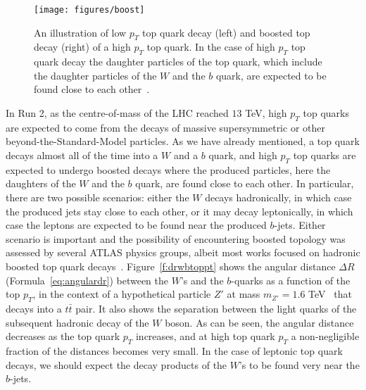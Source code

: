 \vspace{3mm}

\begin{figure}[H]
	\texttt{[image: figures/boost]}
	\centering

	\caption{An illustration of low $p_T$ top quark decay (left) and boosted top
		decay (right) of a high $p_T$ top quark. In the case of high $p_T$ top quark
		decay the daughter particles of the top quark, which include the daughter
		particles of the $W$ and the $b$ quark, are expected to be found close to each
		other~\cite{boostedtop-fig}.}

	\label{f:boosttop}
\end{figure}

\vspace{3mm}

In Run 2, as the centre-of-mass of the LHC reached $13$ TeV, high $p_T$ top
quarks are expected to come from the decays of massive supersymmetric or other
beyond-the-Standard-Model particles. As we have already mentioned, a top quark
decays almost all of the time into a $W$ and a $b$ quark, and high $p_T$ top
quarks are expected to undergo boosted decays where the produced particles,
here the daughters of the $W$ and the $b$ quark, are found close to each other.
In particular, there are two possible scenarios: either the $W$ decays
hadronically, in which case the produced jets stay close to each other, or it
may decay leptonically, in which case the leptons are expected to be found near
the produced $b$-jets. Either scenario is important and the possibility of
encountering boosted topology was assessed by several ATLAS physics groups,
albeit most works focused on hadronic boosted top quark
decays~\cite{hadronic01-ch7, hadronic02-ch7, bdis-figs}.
Figure~\ref{f:drwbtoppt} shows the angular distance $\Delta R$
(Formula~\ref{eq:angulardr}) between the $W$'s and the $b$-quarks as a function
of the top $p_T$, in the context of a hypothetical particle $Z'$ at mass
$m_{Z'}=1.6$ TeV~\cite{bdis-figs} that decays into a $t\bar{t}$ pair. It also
shows the separation between the light quarks of the subsequent hadronic decay
of the $W$ boson. As can be seen, the angular distance decreases as the top
quark $p_T$ increases, and at high top quark $p_T$ a non-negligible fraction of
the distances becomes very small. In the case of leptonic top quark decays, we
should expect the decay products of the $W$'s to be found very near the
$b$-jets.

